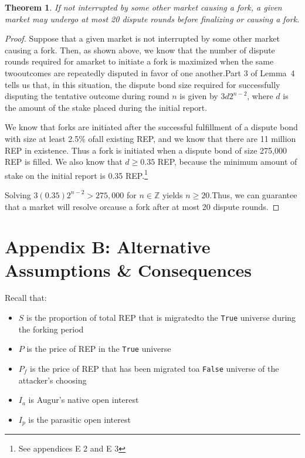 \documentclass[12pt,floatfix,reprint,nofootinbib,amsmath,amssymb,epsfig,pre,floats,letterpaper,groupedaffiliation]{revtex4-1}
\newtheorem{theorem}{Theorem}
\theoremstyle{definition}
\theoremstyle{definition}
\begin{document}
\begin{theorem}
If not interrupted by some other market causing a fork, a given market may undergo at most 20 dispute rounds before finalizing or causing a fork.
\end{theorem}

\begin{proof}
Suppose that a given market is not interrupted by some other market causing a fork. Then, as shown above, we know that the number of dispute rounds required for a\linebreak market to initiate a fork is maximized when the same two\linebreak outcomes are repeatedly disputed in favor of one another.\linebreak Part 3 of Lemma~4 tells us that, in this situation, the dispute bond size required for successfully disputing the tentative outcome during round $n$ is given by $3d 2^{n-2}$, where $d$ is the amount of the stake placed during the initial report.

We know that forks are initiated after the successful fulfillment of a dispute bond with size at least 2.5\% of\linebreak all existing REP, and we know that there are 11 million REP in existence. Thus a fork is initiated when a dispute bond of size 275,000 REP is filled. We also know that $d \geq 0.35$ REP, because the minimum amount of stake on the initial report is 0.35 REP.\footnote{See appendices E 2 and E 3}

Solving $3(0.35) 2^{n-2} > 275,000$ for $n \in \mathbb{Z}$ yields $n \geq 20$.\linebreak Thus, we can guarantee that a market will resolve or\linebreak cause a fork after at most 20 dispute rounds.
\end{proof}

\section*{Appendix B: Alternative Assumptions \& Consequences}

Recall that:
\begin{itemize}
\item $S$ is the proportion of total REP that is migrated\linebreak to the \texttt{True} universe during the forking period
\item $P$ is the price of REP in the \texttt{True} universe
\item $P_f$ is the price of REP that has been migrated to\linebreak a \texttt{False} universe of the attacker's choosing
\item $I_a$ is Augur's native open interest
\item $I_p$ is the parasitic open interest
\end{itemize}
\end{document}
